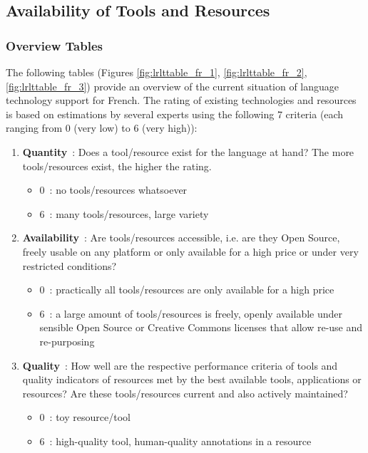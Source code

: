 \begin{multicols}{2}
\subsection{Availability of Tools and Resources}

\subsubsection{Overview Tables}
The following tables (Figures \ref{fig:lrlttable_fr_1}, \ref{fig:lrlttable_fr_2}, \ref{fig:lrlttable_fr_3}) provide an overview of the current situation of
language technology support for French. The rating of existing
technologies and resources is based on estimations by several experts
using the following 7 criteria (each ranging from 0 (very low) to 6
(very high)):

\begin{enumerate}
\item {\bf Quantity}~: Does a tool/resource exist for the language at hand? The more tools/resources exist, the higher the rating.
      \begin{itemize}
      \item 0~: no tools/resources whatsoever
      \item 6~: many tools/resources, large variety
      \end{itemize}

\item {\bf Availability}~: Are tools/resources accessible, i.e. are they Open Source, freely usable on any platform or only available for a high price or under very restricted conditions?
      \begin{itemize}
      \item 0~: practically all tools/resources are only available for a high price
      \item 6~: a large amount of tools/resources is freely, openly available under sensible Open Source or Creative Commons licenses that allow re-use and re-purposing
      \end{itemize}

\item {\bf Quality}~: How well are the respective performance criteria of tools and quality indicators of resources met by the best available tools, applications or resources? Are these tools/resources current and also actively maintained?
      \begin{itemize}
      \item 0~: toy resource/tool
      \item 6~: high-quality tool, human-quality annotations in a resource
      \end{itemize}


\end{enumerate}
\end{multicols}
